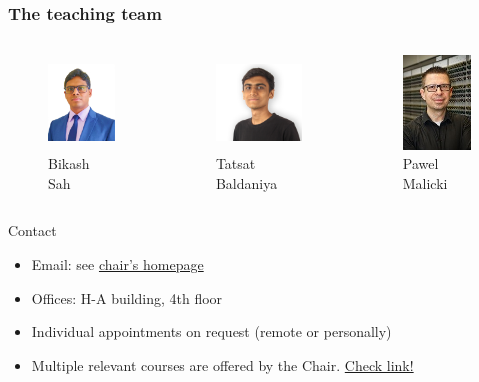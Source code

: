 \begin{frame}
	\frametitle{The teaching team}
	\vspace{-0.5cm}
	\begin{columns}[t]
\centering
		\begin{figure}
			\centering
				\includegraphics[height=2.5cm]{fig/lec01/Bikash.png}
				\caption*{Bikash Sah}
		\end{figure}
	
		\begin{figure}
			\centering
				\includegraphics[height=2.5cm]{fig/lec01/Tatsat.jpg}
				\caption*{Tatsat Baldaniya}
		\end{figure}
		\begin{figure}
			\centering
				\includegraphics[height=2.5cm]{fig/lec01/pawel.jpg}
				\caption*{Pawel Malicki}
		\end{figure}		
	\end{columns}
	\vspace{-0.5cm}
	\begin{varblock}{Contact}
		\begin{itemize}
			\item Email: see \href{https://www.eti.uni-siegen.de/ias/}{chair's homepage}
			\item Offices: H-A building, 4th floor
			\item Individual appointments on request (remote or personally)
            \item Multiple relevant courses are offered by the Chair.  \href{https://www.eti.uni-siegen.de/ias/teaching/}{Check link!}
		\end{itemize}
	\end{varblock}
	\end{frame}



